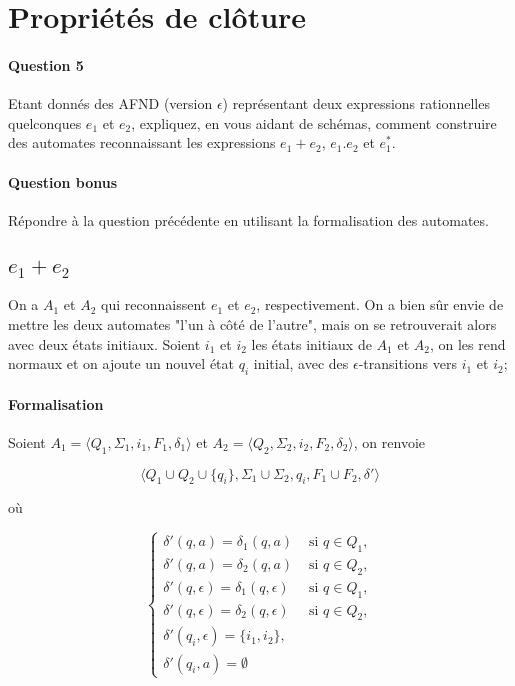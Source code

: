 \documentclass{article}[11pt]
\theoremstyle{definition}
\begin{document}
\section{Propriétés de clôture}

\paragraph*{Question 5} Etant donnés des AFND (version $\epsilon$) représentant deux expressions rationnelles quelconques $e_1$ et $e_2$, expliquez, en vous aidant de schémas, comment construire des automates reconnaissant les expressions $e_1 + e_2$, $e_1.e_2$ et $e_1^*$.

\paragraph*{Question bonus} Répondre à la question précédente en utilisant la formalisation des automates.

\subsection{$e_1 + e_2$} On a $A_1$ et $A_2$ qui reconnaissent $e_1$ et $e_2$, respectivement. On a bien sûr envie de mettre les deux automates "l'un à côté de l'autre", mais on se retrouverait alors avec deux états initiaux. Soient $i_1$ et $i_2$ les états initiaux de $A_1$ et $A_2$, on les rend normaux et on ajoute un nouvel état $q_i$ initial, avec des $\epsilon$-transitions vers $i_1$ et $i_2$;

\paragraph*{Formalisation} Soient $A_1 = \big \langle Q_1,\Sigma_1,i_1,F_1,\delta_1 \big \rangle$ et $A_2 = \big \langle Q_2,\Sigma_2,i_2,F_2,\delta_2 \big \rangle$, on renvoie 

\[
\big \langle Q_1 \cup Q_2 \cup \{q_i\},\Sigma_1 \cup \Sigma_2,q_i,F_1 \cup F_2,\delta' \big \rangle
\]

où

\[
\begin{cases}
\delta'(q,a) = \delta_1(q,a) &\text{ si } q \in Q_1,\\[1ex]
\delta'(q,a) = \delta_2(q,a) &\text{ si } q \in Q_2,\\[1ex]
\delta'(q,\epsilon) = \delta_1(q,\epsilon) &\text{ si } q \in Q_1,\\[1ex]
\delta'(q,\epsilon) = \delta_2(q,\epsilon) &\text{ si } q \in Q_2,\\[1ex]
\delta'(q_i,\epsilon) = \{i_1,i_2\},\\[1ex]
\delta'(q_i,a) = \emptyset
 \end{cases}
\]
\end{document}
